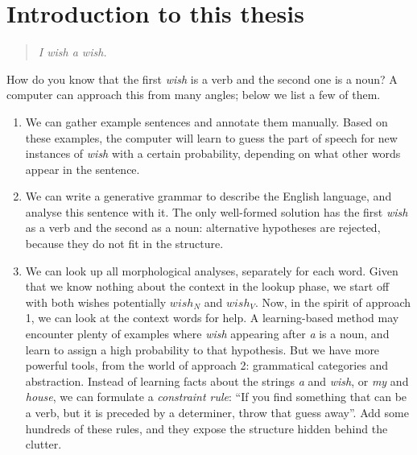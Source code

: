 \chapter{Introduction to this thesis}


\begin{quote}
\emph{I wish a wish.}
\end{quote}

\noindent How do you know that the first \emph{wish} is a verb and the second one is a noun? A computer can approach this from many angles; below we list a few of them.

\begin{enumerate}
\item We can gather example sentences and annotate them manually. %
Based on these examples, the computer will learn to guess the 
part of speech for new instances of \emph{wish} with a certain probability, 
depending on what other words appear in the sentence.

\item We can write a generative grammar to describe the English language, and analyse this sentence with it. 
The only well-formed solution has the first \emph{wish} as a verb and the second as a noun: alternative hypotheses are rejected, 
because they do not fit in the structure.


\item We can look up all morphological analyses, separately for each word.
Given that we know nothing about the context in the lookup phase, we start off with both wishes potentially $wish_N$ and $wish_V$.
Now, in the spirit of approach 1, we can look at the context words for help. A learning-based method may encounter plenty of examples where \emph{wish} appearing after \emph{a} is a noun, and learn to assign a high probability to that hypothesis. 
But we have more powerful tools, from the world of approach 2: grammatical categories and abstraction.
Instead of learning facts about the strings \emph{a} and \emph{wish}, or \emph{my} and \emph{house}, we can formulate a \emph{constraint rule}: ``If you find something that can be a verb, but it is preceded by a determiner, throw that guess away''. 
Add some hundreds of these rules, and they expose the structure hidden behind the clutter.
\end{enumerate}

